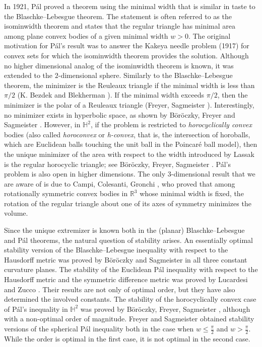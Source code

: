 \documentclass[12pt,reqno]{amsart}
\theoremstyle{remark}
\newcommand{\R}{{\mathbb R}}
\newcommand{\hyp}{{\mathbb H}}
\begin{document}
In 1921, P\'al \cite{Pal} proved a theorem using the minimal width that is similar in taste to the Blaschke--Lebesgue theorem. The statement is often referred to as the isominwidth theorem and states that the regular triangle has minimal area among plane convex bodies of a given minimal width $w>0$. The original motivation for P\'al's result was to answer the Kakeya needle problem (1917) for convex sets for which the isominwidth theorem provides the solution.
Although no higher dimensional analog of the isominwidth theorem is known, it was extended to the $2$-dimensional sphere. Similarly to the Blaschke--Lebesgue theorem, the minimizer is the Reuleaux triangle if the minimal width is less than $\pi/2$ (K. Bezdek and Blekherman \cite{Bez00}). If the minimal width exceeds $\pi/2$, then the minimizer is the polar of a Reuleaux triangle (Freyer, Sagmeister \cite{FS}). Interestingly, no minimizer exists in hyperbolic space, as shown by B\"or\"oczky, Freyer and Sagmeister \cite{BoFS}. However, in $\hyp^2$, if the problem is restricted to \emph{horocyclically convex} bodies (also called \emph{horoconvex} or \emph{h-convex}, that is, the intersection of horoballs, which are Euclidean balls touching the unit ball in the Poincar\'e ball model), then the unique minimizer of the area with respect to the width introduced by Lassak \cite{Las23} is the regular horocyclic triangle; see B\"or\"oczky, Freyer, Sagmeister \cite{BoFS}. P\'al's problem is also open in higher dimensions. The only $3$-dimensional result that we are aware of is due to Campi, Colesanti, Gronchi \cite{CCG96}, who proved that among rotationally symmetric convex bodies in $\R^3$ whose minimal width is fixed, the rotation of the regular triangle about one of its axes of symmetry minimizes the volume.  

Since the unique extremizer is known both in the (planar) Blaschke--Lebesgue and P\'al theorems, the natural question of stability arises.  An essentially optimal stability version of the Blaschke--Lebesgue inequality with respect to the Hausdorff metric was proved by B\"or\"oczky and Sagmeister \cite{BoS22} in all three constant curvature planes. The stability of the Euclidean Pál inequality with respect to the Hausdorff metric and the symmetric difference metric was proved by Lucardesi and Zucco \cite{LZ24}. Their results are not only of optimal order, but they have also determined the involved constants. The stability of the horocyclically convex case of P\'al's inequality in $\hyp^2$ was proved by B\"or\"oczky, Freyer, Sagmeister \cite{BoFS}, although with a non-optimal order of magnitude.  Freyer and Sagmeister \cite{FS} obtained stability versions of the spherical P\'al inequality both in the case when $w\leq \frac{\pi}2$ and $w>\frac{\pi}{2}$. While the order is optimal in the first case, it is not optimal in the second case.
\end{document}
